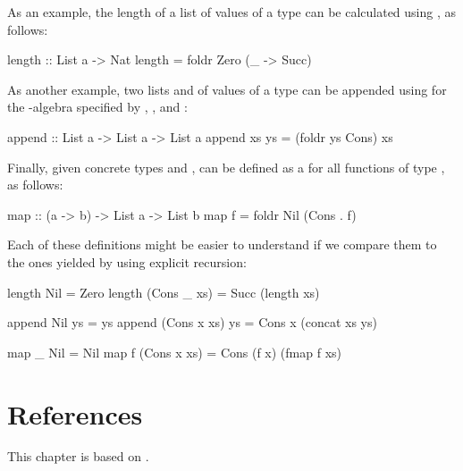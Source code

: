 \begin{example}
  As an example, the length of a list of values of a type
   can be calculated using , as
  follows:
  \begin{codehaskell}
length :: List a -> Nat
length = foldr Zero (\_ -> Succ)
  \end{codehaskell}
  As another example, two lists  and 
  of values of a type  can be appended using
   for the -algebra specified by
  , , and :
  \begin{codehaskell}
append :: List a -> List a -> List a
append xs ys = (foldr ys Cons) xs
  \end{codehaskell}
  Finally, given concrete types  and ,
   can be defined as a  for all
  functions  of type , as follows:
  \begin{codehaskell}
map :: (a -> b) -> List a -> List b
map f = foldr Nil (Cons . f)
  \end{codehaskell}
  Each of these definitions might be easier to understand if we
  compare them to the ones yielded by using explicit recursion:
  \begin{codehaskell}
length Nil         = Zero
length (Cons _ xs) = Succ (length xs)

append Nil         ys = ys
append (Cons x xs) ys = Cons x (concat xs ys)

map _ Nil         = Nil
map f (Cons x xs) = Cons (f x) (fmap f xs)
  \end{codehaskell}

\end{example}

\section{References}
\label{sec:algebras-references}

This chapter is based on \parencite[§ 2.1]{vene-2000}.

\clearemptydoublepage
